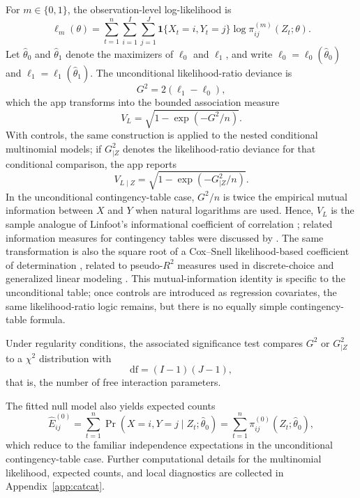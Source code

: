 \documentclass[11pt]{article}
\begin{document}
For $m \in \{0,1\}$, the observation-level log-likelihood is
\begin{equation}
\ell_m(\theta) =
\sum_{t=1}^{n}\sum_{i=1}^{I}\sum_{j=1}^{J}
\mathbf{1}\{X_t=i, Y_t=j\}
\log \pi^{(m)}_{ij}(Z_t;\theta).
\label{eq:loglik}
\end{equation}
Let $\widehat{\theta}_0$ and $\widehat{\theta}_1$ denote the maximizers of
$\ell_0$ and $\ell_1$, and write $\ell_0 = \ell_0(\widehat{\theta}_0)$ and
$\ell_1 = \ell_1(\widehat{\theta}_1)$. The unconditional likelihood-ratio
deviance is
\begin{equation*}
G^2 = 2(\ell_1 - \ell_0),
\end{equation*}
which the app transforms into the bounded association measure
\begin{equation*}
V_L = \sqrt{1 - \exp(-G^2/n)}.
\end{equation*}
With controls, the same construction is applied to the nested conditional
multinomial models; if $G^2_{\mid Z}$ denotes the likelihood-ratio deviance
for that conditional comparison, the app reports
\begin{equation*}
V_{L\mid Z} = \sqrt{1 - \exp(-G^2_{\mid Z}/n)}.
\end{equation*}
In the unconditional contingency-table case, $G^2/n$ is twice the empirical
mutual information between $X$ and $Y$ when natural logarithms are used.
Hence, $V_L$ is the sample analogue of Linfoot's informational coefficient of
correlation \citep{Linfoot1957}; related information measures for contingency
tables were discussed by \citet{HamdanTsokos1971}. The same transformation is
also the square root of a Cox--Snell likelihood-based coefficient of
determination \citep{CoxSnell1989}, related to pseudo-$R^2$ measures used in
discrete-choice and generalized linear modeling \citep{McFadden1974,
Nagelkerke1991}. This mutual-information identity is specific to the
unconditional table; once controls are introduced as regression covariates, the
same likelihood-ratio logic remains, but there is no equally simple
contingency-table formula.

Under regularity conditions, the associated significance test compares $G^2$
or $G^2_{\mid Z}$ to a $\chi^2$ distribution with
\begin{equation*}
\mathrm{df} = (I-1)(J-1),
\end{equation*}
that is, the number of free interaction parameters.

The fitted null model also yields expected counts
\begin{equation}
\widehat{E}^{(0)}_{ij}
=
\sum_{t=1}^{n}\Pr(X=i, Y=j \mid Z_t; \widehat{\theta}_0)
=
\sum_{t=1}^{n}\pi^{(0)}_{ij}(Z_t; \widehat{\theta}_0),
\label{eq:e0}
\end{equation}
which reduce to the familiar independence expectations in the unconditional
contingency-table case. Further computational details for the multinomial
likelihood, expected counts, and local diagnostics are collected in
Appendix~\ref{app:catcat}.
\end{document}
